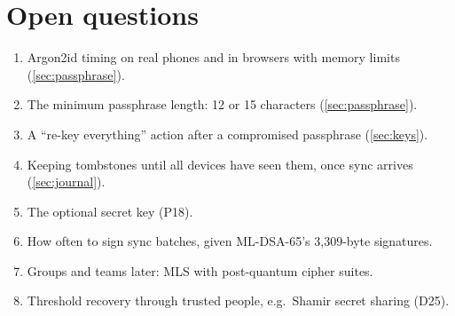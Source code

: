 \documentclass[11pt,a4paper]{article}
\newcommand{\dref}[1]{\textsf{#1}} %
\begin{document}
\section{Open questions}

\begin{enumerate}
  \item Argon2id timing on real phones and in browsers with memory limits (\cref{sec:passphrase}).
  \item The minimum passphrase length: 12 or 15 characters (\cref{sec:passphrase}).
  \item A ``re-key everything'' action after a compromised passphrase (\cref{sec:keys}).
  \item Keeping tombstones until all devices have seen them, once sync arrives (\cref{sec:journal}).
  \item The optional secret key (\dref{P18}).
  \item How often to sign sync batches, given ML-DSA-65's 3{,}309-byte signatures.
  \item Groups and teams later: MLS with post-quantum cipher suites.
  \item Threshold recovery through trusted people, e.g.\ Shamir secret sharing (\dref{D25}).
\end{enumerate}
\end{document}
